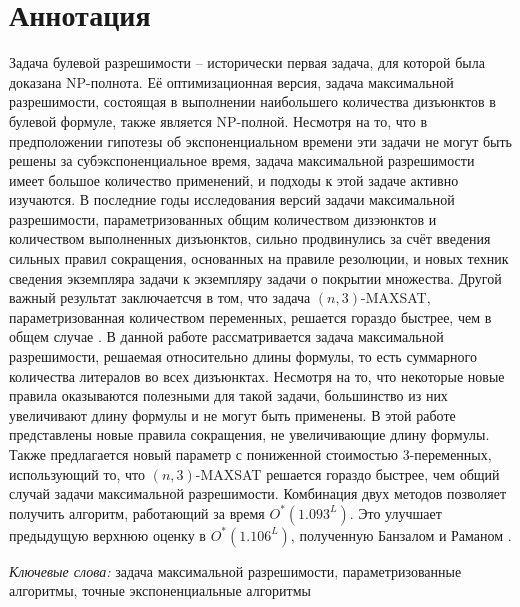 
\section*{Аннотация}
\label{sec:annotation}

\firstpar{}Задача булевой разрешимости -- исторически первая задача, для которой была доказана NP-полнота. Её оптимизационная версия, задача максимальной разрешимости, состоящая в выполнении наибольшего количества дизъюнктов в булевой формуле, также является NP-полной. Несмотря на то, что в предположении гипотезы об экспоненциальном времени эти задачи не могут быть решены за субэкспоненциальное время, задача максимальной разрешимости имеет большое количество применений, и подходы к этой задаче активно изучаются. В последние годы исследования версий задачи максимальной разрешимости, параметризованных общим количеством дизэюнктов и количеством выполненных дизъюнктов, сильно продвинулись за счёт введения сильных правил сокращения, основанных на правиле резолюции, и новых техник сведения экземпляра задачи к экземпляру задачи о покрытии множества. Другой важный результат заключаетсчя в том, что задача $(n,3)$-MAXSAT, параметризованная количеством переменных, решается гораздо быстрее, чем в общем случае \cite{belova18}. В данной работе рассматривается задача максимальной разрешимости, решаемая относительно длины формулы, то есть суммарного количества литералов во всех дизъюнктах. Несмотря на то, что некоторые новые правила оказываются полезными для такой задачи, большинство из них увеличивают длину формулы и не могут быть применены. В этой работе представлены новые правила сокращения, не увеличивающие длину формулы. Также предлагается новый параметр с пониженной стоимостью 3-переменных, использующий то, что $(n,3)$-MAXSAT решается гораздо быстрее, чем общий случай задачи максимальной разрешимости. Комбинация двух методов позволяет получить алгоритм, работающий за время $O^*(1.093^L)$. Это улучшает предыдущую верхнюю оценку в $O^*(1.106^L)$, полученную Банзалом и Раманом \cite{bansal99}.

\vspace{14pt}

\textit{Ключевые слова:} задача максимальной разрешимости, параметризованные алгоритмы, точные экспоненциальные алгоритмы

\newpage

